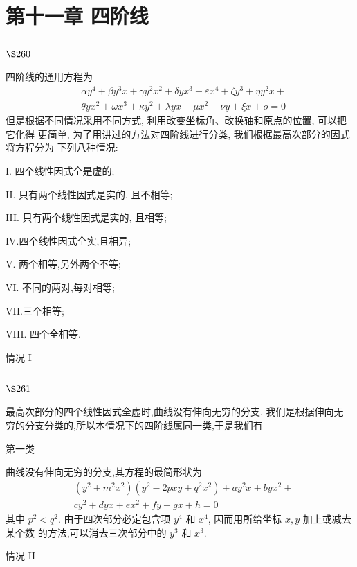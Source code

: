 \chapter{第十一章 四阶线}

\section{$\S 260$}

四阶线的通用方程为
\[
\begin{aligned}
& \alpha y^{4}+\beta y^{3} x+\gamma y^{2} x^{2}+\delta y x^{3}+\varepsilon x^{4}+\zeta y^{3}+\eta y^{2} x+ \\
& \theta y x^{2}+\omega x^{3}+\kappa y^{2}+\lambda y x+\mu x^{2}+\nu y+\xi x+o=0
\end{aligned}
\]
但是根据不同情况采用不同方式, 利用改变坐标角、改换轴和原点的位置, 可以把它化得 更简单, 为了用讲过的方法对四阶线进行分类, 我们根据最高次部分的因式将方程分为 下列八种情况:

I. 四个线性因式全是虚的;

II. 只有两个线性因式是实的, 且不相等;

III. 只有两个线性因式是实的, 且相等;

IV.四个线性因式全实,且相异;

$\mathrm{V}$. 两个相等,另外两个不等;

VI. 不同的两对,每对相等;

VII.三个相等;

VIII. 四个全相等.

情况 I

\section{$\S 261$}

最高次部分的四个线性因式全虚时,曲线没有伸向无穷的分支. 我们是根据伸向无 穷的分支分类的,所以本情况下的四阶线属同一类,于是我们有

第一类

曲线没有伸向无穷的分支,其方程的最简形状为
\[
\begin{aligned}
& \left(y^{2}+m^{2} x^{2}\right)\left(y^{2}-2 p x y+q^{2} x^{2}\right)+a y^{2} x+b y x^{2}+ \\
& c y^{2}+d y x+e x^{2}+f y+g x+h=0
\end{aligned}
\]
其中 $p^{2}<q^{2}$. 由于四次部分必定包含项 $y^{4}$ 和 $x^{4}$, 因而用所给坐标 $x, y$ 加上或减去某个数 的方法,可以消去三次部分中的 $y^{3}$ 和 $x^{3}$. 

情况 II

